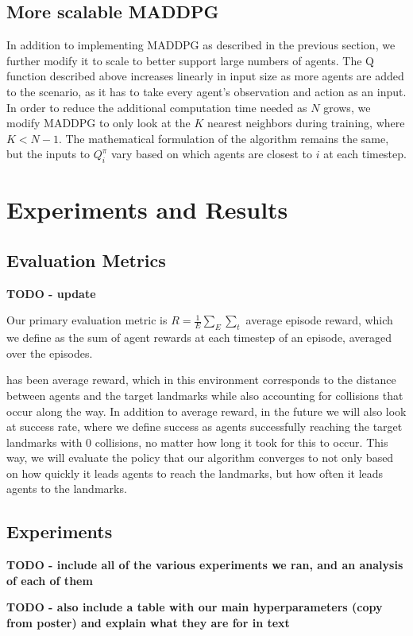 \documentclass{article}
\begin{document}
\subsection{More scalable MADDPG}
In addition to implementing MADDPG as described in the previous section, we further modify it to scale to better support large numbers of agents. The Q function described above increases linearly in input size as more agents are added to the scenario, as it has to take every agent's observation and action as an input. In order to reduce the additional computation time needed as $N$ grows, we modify MADDPG to only look at the $K$ nearest neighbors during training, where $K < N-1$. The mathematical formulation of the algorithm remains the same, but the inputs to $Q^\pi_i$ vary based on which agents are closest to $i$ at each timestep.

\section{Experiments and Results}
\subsection{Evaluation Metrics}
\textbf{TODO - update}

Our primary evaluation metric is $R = \frac{1}{E} \sum\limits_E \sum\limits_t $ average episode reward, which we define as the sum of agent rewards at each timestep of an episode, averaged over the episodes. 

 has been average reward, which in this environment corresponds to the distance between agents and the target landmarks while also accounting for collisions that occur along the way. In addition to average reward, in the future we will also look at success rate, where we define success as agents successfully reaching the target landmarks with 0 collisions, no matter how long it took for this to occur. This way, we will evaluate the policy that our algorithm converges to not only based on how quickly it leads agents to reach the landmarks, but how often it leads agents to the landmarks.

\subsection{Experiments}

\textbf{TODO - include all of the various experiments we ran, and an analysis of each of them}

\textbf{TODO - also include a table with our main hyperparameters (copy from poster) and explain what they are for in text}
\end{document}
